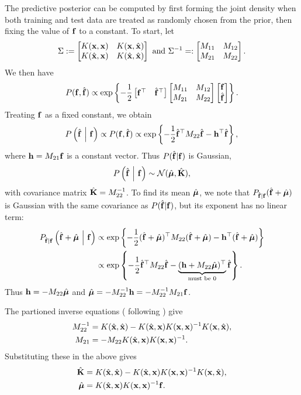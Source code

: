 The predictive posterior can be computed by first forming the joint density when both training and test data are treated as randomly chosen from the prior, then fixing the value of $\mathbf{f}$ to a constant.  To start, let
\[
  \Sigma := \begin{bmatrix} 
    K(\mathbf{x}, \mathbf{x})     & K(\mathbf{x}, \hat{\mathbf{x}})     \\
    K(\hat{\mathbf{x}}, \mathbf{x}) & K(\hat{\mathbf{x}}, \hat{\mathbf{x}})
   \end{bmatrix}
  \text{ and }
  \Sigma^{-1} =: \begin{bmatrix} 
    M_{11} & M_{12} \\
    M_{21} & M_{22}
   \end{bmatrix}.
\]
We then have
\[
  P(\mathbf{f}, \hat{\mathbf{f}})
  \propto
  \exp\left\{ 
    -\frac12
    \begin{bmatrix} \mathbf{f}^\top & \hat{\mathbf{f}}^\top \end{bmatrix}
    \begin{bmatrix} M_{11} & M_{12} \\ M_{21} & M_{22} \end{bmatrix}
    \begin{bmatrix} \mathbf{f} \\ \hat{\mathbf{f}} \end{bmatrix}
   \right\}.
\]
Treating $\mathbf{f}$ as a fixed constant, we obtain
\[
  P\left( \hat{\mathbf{f}} \ \middle\vert\  \mathbf{f} \right)
  \propto
  P(\mathbf{f}, \hat{\mathbf{f}})
  \propto
  \exp\left\{ 
    -\frac12 \hat{\mathbf{f}}^\top M_{22} \hat{\mathbf{f}}
    - \mathbf{h}^\top \hat{\mathbf{f}}
   \right\},
\]
where $\mathbf{h} = M_{21} \mathbf{f}$ is a constant vector.  Thus $P(\hat{\mathbf{f}} | \mathbf{f})$ is Gaussian,
\begin{equation}
  P\left( \hat{\mathbf{f}} \ \middle\vert\  \mathbf{f} \right) \sim \mathcal{N}(\hat{\bm{\mu}}, \hat{\mathbf{K}}),
\end{equation}
with covariance matrix $\hat{\mathbf{K}} = M_{22}^{-1}$.  To find its mean $\hat{\bm{\mu}}$, we note that $P_{\hat{\mathbf{f}}|\mathbf{f}}(\hat{\mathbf{f}} + \hat{\bm{\mu}})$ is Gaussian with the same covariance as $P(\hat{\mathbf{f}} | \mathbf{f})$, but its exponent has no linear term:
\begin{align*}
  P_{\hat{\mathbf{f}}|\mathbf{f}} \left( \hat{\mathbf{f}} + \hat{\bm{\mu}} \ \middle\vert\  \mathbf{f} \right)
  &\propto
  \exp\left\{ 
    -\frac12 (\hat{\mathbf{f}} + \hat{\bm{\mu}})^\top M_{22} (\hat{\mathbf{f}} + \hat{\bm{\mu}})
    - \mathbf{h}^\top (\hat{\mathbf{f}} + \hat{\bm{\mu}})
   \right\} \\
  &\propto
  \exp\left\{ 
    -\frac12 \hat{\mathbf{f}}^\top M_{22} \hat{\mathbf{f}}
    - \underbrace{(\mathbf{h} + M_{22} \hat{\bm{\mu}})^\top}_{\text{must be $0$}} \hat{\mathbf{f}}
   \right\}.
\end{align*}
Thus $\mathbf{h} = -M_{22} \hat{\bm{\mu}}$ and $\hat{\bm{\mu}} = -M_{22}^{-1} \mathbf{h} = -M_{22}^{-1} M_{21} \mathbf{f}$.

The partioned inverse equations (\citealp*{barnett1979matrix} following \citealp*{mackay1998introduction}) give
\begin{align*}
  M_{22}^{-1} &= K(\hat{\mathbf{x}},\hat{\mathbf{x}}) - K(\hat{\mathbf{x}},\mathbf{x}) K(\mathbf{x},\mathbf{x})^{-1} K(\mathbf{x},\hat{\mathbf{x}}), \\
  M_{21} &= -M_{22} K(\hat{\mathbf{x}},\mathbf{x}) K(\mathbf{x},\mathbf{x})^{-1}.
\end{align*}
Substituting these in the above gives
\begin{align}
  \hat{\mathbf{K}} &= K(\hat{\mathbf{x}},\hat{\mathbf{x}}) - K(\hat{\mathbf{x}},\mathbf{x}) K(\mathbf{x},\mathbf{x})^{-1} K(\mathbf{x},\hat{\mathbf{x}}), \\
  \hat{\bm{\mu}} &= K(\hat{\mathbf{x}},\mathbf{x}) K(\mathbf{x},\mathbf{x})^{-1}\mathbf{f}.
\end{align}

